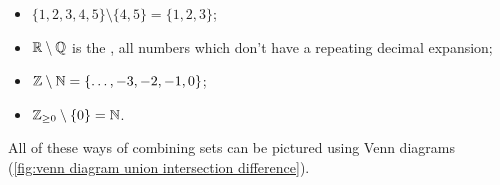 \documentclass[fleqn]{LectureClass/LectureClass}
\begin{document}
    \begin{exm}{}{}
        \begin{itemize}
            \item \(\{1, 2, 3, 4, 5\} \setminus \{4, 5\} = \{1, 2, 3\}\);
            \item \(\mathbb{R} \setminus \mathbb{Q}\) is the , all numbers which don't have a repeating decimal expansion;
            \item \(\mathbb{Z} \setminus \mathbb{N} = \{\dotsc, -3, -2, -1, 0\}\);
            \item \(\mathbb{Z}_{\ge 0} \setminus \{0\} = \mathbb{N}\).
        \end{itemize}
    \end{exm}
    
    All of these ways of combining sets can be pictured using Venn diagrams (\cref{fig:venn diagram union intersection difference}).
    
\end{document}
